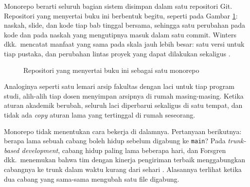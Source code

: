 Monorepo berarti seluruh bagian sistem disimpan dalam satu repositori Git.
Repositori yang menyertai buku ini berbentuk begitu, seperti pada Gambar
\ref{fig:monorepo01}: naskah, slide, dan kode tiap bab tinggal bersama,
sehingga satu perubahan pada kode dan pada naskah yang mengutipnya masuk
dalam satu commit. Winters dkk.\ mencatat manfaat yang sama pada skala jauh
lebih besar: satu versi untuk tiap pustaka, dan perubahan lintas proyek yang
dapat dilakukan sekaligus \cite{winters2020swe}.

\begin{figure}[!htb]
  \centering
  \caption{Repositori yang menyertai buku ini sebagai satu monorepo}
  \label{fig:monorepo01}
\end{figure}

Analoginya seperti satu lemari arsip fakultas dengan laci untuk tiap program
studi, alih-alih tiap dosen menyimpan arsipnya di rumah masing-masing. Ketika
aturan akademik berubah, seluruh laci diperbarui sekaligus di satu tempat,
dan tidak ada \textit{copy} aturan lama yang tertinggal di rumah seseorang.

Monorepo tidak menentukan cara bekerja di dalamnya. Pertanyaan berikutnya:
berapa lama sebuah cabang boleh hidup sebelum digabung ke \texttt{main}? Pada
\textit{trunk-based development}, cabang hidup paling lama beberapa hari, dan
Forsgren dkk.\ menemukan bahwa tim dengan kinerja pengiriman terbaik
menggabungkan cabangnya ke trunk dalam waktu kurang dari sehari
\cite{forsgren2018accelerate}. Alasannya terlihat ketika dua cabang yang
sama-sama mengubah satu file digabung.

